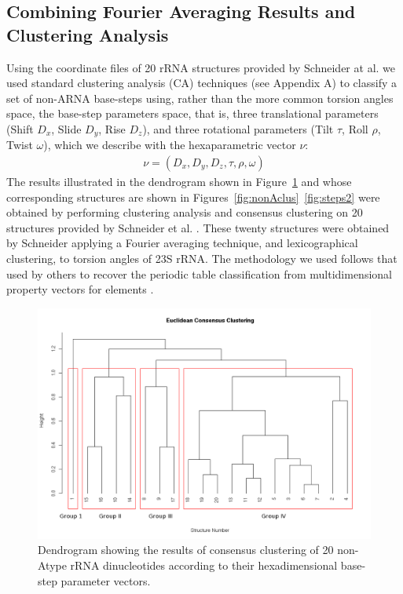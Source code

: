 \subsection{Combining Fourier Averaging Results and Clustering Analysis}
Using  the  coordinate  files  of  20  rRNA  structures  provided  by
Schneider  at  al.\cite{schneider2004}  we  used  standard  clustering
analysis  (CA)  techniques (see  Appendix  A)  to  classify a  set  of
non-ARNA base-steps using, rather  than the more common torsion angles
space, the  base-step parameters  space, that is,  three translational
parameters  (Shift   $D_x$,  Slide  $D_y$,  Rise   $D_z$),  and  three
rotational  parameters  (Tilt $\tau$,  Roll  $\rho$, Twist  $\omega$),
which we describe with the hexaparametric vector $\nu$:
\begin{gather}
 \nu = (D_x, D_y, D_z, \tau, \rho, \omega)
\end{gather}
The    results    illustrated    in    the   dendrogram    shown    in
Figure~\ref{fig:eucl_cons}  and  whose  corresponding  structures  are
shown in  Figures~\ref{fig:nonAclus}~\ref{fig:steps2} were obtained by
performing  clustering   analysis  and  consensus   clustering  on  20
structures provided by  Schneider et al.  \cite{schneider2004}.  These
twenty  structures  were  obtained  by Schneider  applying  a  Fourier
averaging technique, and lexicographical clustering, to torsion angles
of 23S rRNA.   The methodology we used follows that  used by others to
recover  the  periodic   table  classification  from  multidimensional
property vectors for elements \cite{restrepo2004, restrepo2006}.
\begin{figure}[htbp]
 \centering
\includegraphics[angle=90, scale=0.6]{Chapter2/eucli_cons_nonA-RNA.png}
\caption{Dendrogram showing the results  of consensus clustering of 20
non-Atype  rRNA  dinucleotides   according  to  their  hexadimensional
base-step parameter vectors.}
 \label{fig:eucl_cons}
\end{figure}

